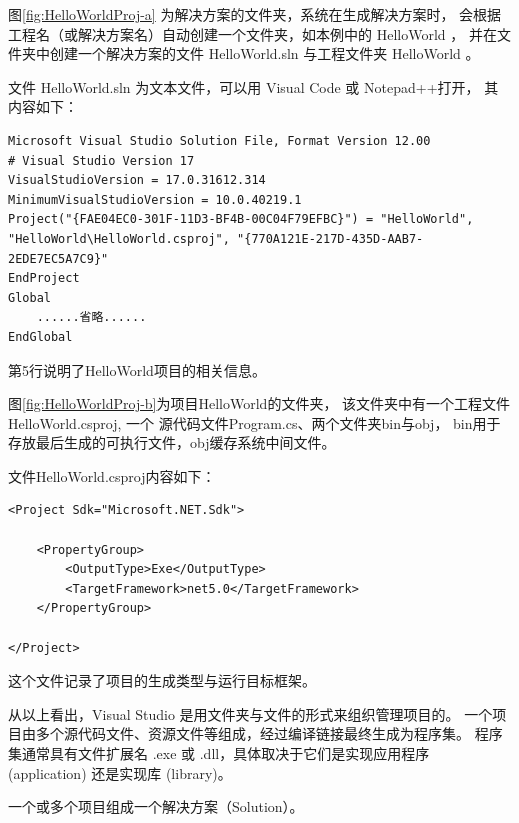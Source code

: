 图\ref{fig:HelloWorldProj-a} 为解决方案的文件夹，系统在生成解决方案时，
会根据工程名（或解决方案名）自动创建一个文件夹，如本例中的 HelloWorld ，
并在文件夹中创建一个解决方案的文件 HelloWorld.sln 与工程文件夹 HelloWorld 。

文件 HelloWorld.sln 为文本文件，可以用 Visual Code 或 Notepad++打开，
其内容如下：

\begin{lstlisting}
Microsoft Visual Studio Solution File, Format Version 12.00
# Visual Studio Version 17
VisualStudioVersion = 17.0.31612.314
MinimumVisualStudioVersion = 10.0.40219.1
Project("{FAE04EC0-301F-11D3-BF4B-00C04F79EFBC}") = "HelloWorld", "HelloWorld\HelloWorld.csproj", "{770A121E-217D-435D-AAB7-2EDE7EC5A7C9}"
EndProject
Global
	......省略......
EndGlobal
\end{lstlisting}

第5行说明了HelloWorld项目的相关信息。

图\ref{fig:HelloWorldProj-b}为项目HelloWorld的文件夹，
该文件夹中有一个工程文件HelloWorld.csproj,
一个  \cs  源代码文件Program.cs、两个文件夹bin与obj，
bin用于存放最后生成的可执行文件，obj缓存系统中间文件。

文件HelloWorld.csproj内容如下：
\begin{lstlisting}
<Project Sdk="Microsoft.NET.Sdk">

	<PropertyGroup>
		<OutputType>Exe</OutputType>
		<TargetFramework>net5.0</TargetFramework>
	</PropertyGroup>

</Project>
\end{lstlisting}

这个文件记录了项目的生成类型与运行目标框架。

从以上看出，Visual Studio 是用文件夹与文件的形式来组织管理项目的。
一个项目由多个源代码文件、资源文件等组成，经过编译链接最终生成为程序集。
程序集通常具有文件扩展名 .exe 或 .dll，具体取决于它们是实现应用程序 (application) 还是实现库 (library)。

一个或多个项目组成一个解决方案（Solution）。


